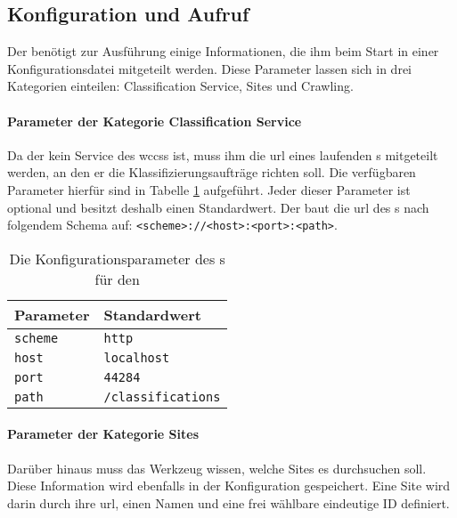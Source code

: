 \subsection{Konfiguration und Aufruf}
    Der {\wordpressCrawler} benötigt zur Ausführung einige Informationen,
    die ihm beim Start in einer Konfigurationsdatei mitgeteilt werden.
    Diese Parameter lassen sich in drei Kategorien einteilen:
    Classification Service, Sites und Crawling.

    \paragraph*{Parameter der Kategorie Classification Service}
    Da der {\wordpressCrawler} kein Service des \glspl{wccs} ist,
    muss ihm die \gls{url} eines laufenden {\classificationService}s mitgeteilt werden,
    an den er die Klassifizierungsaufträge richten soll.
    Die verfügbaren Parameter hierfür sind in Tabelle \ref{table:crawlerClassificationServiceParameter} aufgeführt.
    Jeder dieser Parameter ist optional und besitzt deshalb einen Standardwert.
    Der {\wordpressCrawler} baut die \gls{url} des {\classificationService}s nach
    folgendem Schema auf: \texttt{<scheme>://<host>:<port>:<path>}.

    \begin{table}[htb]
        \centering
        \begin{tabular}{|l|l|}
            \hline
            \textbf{Parameter} & \textbf{Standardwert}\\
            \hline
            \texttt{scheme} & \texttt{http} \\
            \hline
            \texttt{host} & \texttt{localhost} \\
            \hline
            \texttt{port} & \texttt{44284} \\
            \hline
            \texttt{path} & \texttt{/classifications} \\
            \hline
            \end{tabular}
        \caption{Die Konfigurationsparameter des {\wordpressCrawler}s für den {\classificationService}}
        \label{table:crawlerClassificationServiceParameter}
    \end{table}

    \paragraph*{Parameter der Kategorie Sites}
    Darüber hinaus muss das Werkzeug wissen,
    welche {\wordpress} Sites es durchsuchen soll.
    Diese Information wird ebenfalls in der Konfiguration gespeichert.
    Eine {\wordpress} Site wird darin durch
    ihre \gls{url}, einen Namen und eine frei wählbare eindeutige ID definiert.

